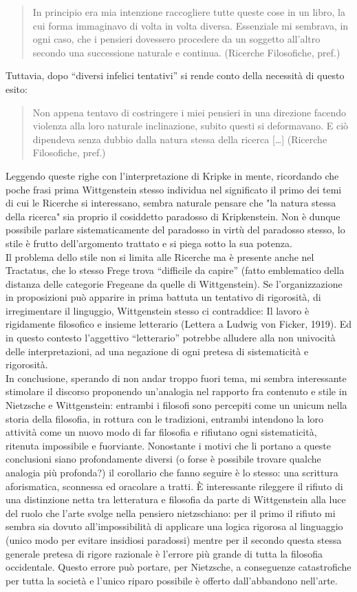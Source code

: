 \documentclass[10pt,a4paper]{article}
\begin{document}
\begin{quote}
	In principio era mia intenzione raccogliere tutte queste cose in un libro, la cui forma immaginavo di volta in volta diversa. Essenziale mi sembrava, in ogni caso, che i pensieri dovessero procedere da un soggetto all’altro secondo una successione naturale e continua. (Ricerche Filosofiche, pref.)
\end{quote}
Tuttavia, dopo “diversi infelici tentativi” si rende conto della necessità di questo esito:
\begin{quote}
	Non appena tentavo di costringere i miei pensieri in una direzione facendo violenza alla loro naturale inclinazione, subito questi si deformavano. E ciò dipendeva senza dubbio dalla natura stessa della ricerca […] (Ricerche Filosofiche, pref.)
\end{quote}
Leggendo queste righe con l’interpretazione di Kripke in mente, ricordando che poche frasi prima Wittgenstein stesso individua nel significato il primo dei temi di cui le Ricerche si interessano, sembra naturale pensare che "la natura stessa della ricerca" sia proprio il cosiddetto paradosso di Kripkenstein. Non è dunque possibile parlare sistematicamente del paradosso in virtù del paradosso stesso, lo stile è frutto dell’argomento trattato e si piega sotto la sua potenza.\\
Il problema dello stile non si limita alle Ricerche ma è presente anche nel Tractatus, che lo stesso Frege trova “difficile da capire” (fatto emblematico della distanza delle categorie Fregeane da quelle di Wittgenstein). Se l’organizzazione in proposizioni può apparire in prima battuta un tentativo di rigorosità, di irregimentare il linguggio, Wittgenstein stesso ci contraddice: Il lavoro è rigidamente filosofico e insieme letterario (Lettera a Ludwig von Ficker, 1919). Ed in questo contesto l’aggettivo “letterario” potrebbe alludere alla non univocità delle interpretazioni, ad una negazione di ogni pretesa di sistematicità e rigorosità.\\ 
In conclusione, sperando di non andar troppo fuori tema, mi sembra interessante stimolare il discorso proponendo un’analogia nel rapporto fra contenuto e stile in Nietzsche e Wittgenstein: entrambi i filosofi sono percepiti come un unicum nella storia della filosofia, in rottura con le tradizioni, entrambi intendono la loro attività come un nuovo modo di far filosofia e rifiutano ogni sistematicità, ritenuta impossibile e fuorviante. Nonostante i motivi che li portano a queste conclusioni siano profondamente diversi (o forse è possibile trovare qualche analogia più profonda?) il corollario che fanno seguire è lo stesso: una scrittura aforismatica, sconnessa ed oracolare a tratti. È interessante rileggere il rifiuto di una distinzione netta tra letteratura e filosofia  da parte di Wittgenstein alla luce del ruolo che l’arte svolge nella pensiero nietzschiano: per il primo il rifiuto mi sembra sia dovuto all’impossibilità di applicare una logica rigorosa al linguaggio (unico modo per evitare insidiosi paradossi) mentre per il secondo questa stessa generale pretesa di rigore razionale è l’errore più grande di tutta la filosofia occidentale. Questo errore può portare, per Nietzsche, a conseguenze catastrofiche per tutta la società e l’unico riparo possibile è offerto dall’abbandono nell’arte.
\end{document}
